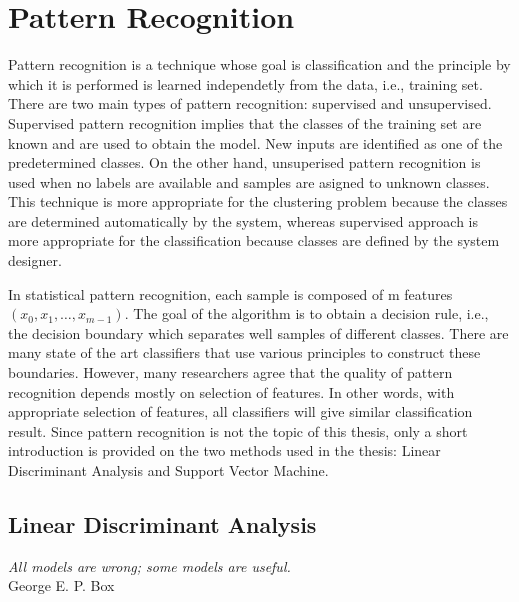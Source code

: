 \documentclass{article}
\begin{document}



\section{Pattern Recognition}

Pattern recognition is a technique whose goal is classification and the principle by which it is performed is learned independetly from the data, i.e., training set. There are two main types of pattern recognition: supervised and unsupervised. Supervised pattern recognition implies that the classes of the training set are known and are used to obtain the model. New inputs are identified as one of the predetermined classes. On the other hand, unsuperised pattern recognition is used when no labels are available and samples are asigned to unknown classes. This technique is more appropriate for the clustering problem because the classes are determined automatically by the system, whereas supervised approach is more appropriate for the classification because classes are defined by the system designer.

In statistical pattern recognition, each sample is composed of m features $(x_0, x_1, \dots, x_{m-1})$. The goal of the algorithm is to obtain a decision rule, i.e., the decision boundary which separates well samples of different classes. There are many state of the art classifiers that use various principles to construct these boundaries. However, many researchers agree that the quality of pattern recognition depends mostly on selection of features. In other words, with appropriate selection of features, all classifiers will give similar classification result. Since pattern recognition is not the topic of this thesis, only a short introduction is provided on the two methods used in the thesis: Linear Discriminant Analysis and Support Vector Machine.


\subsection{Linear Discriminant Analysis}

\begin{myquote}
\begin{flushright}
\textit{All models are wrong; some models are useful.} \\George E. P. Box
\end{flushright}
\end{myquote}
\end{document}
